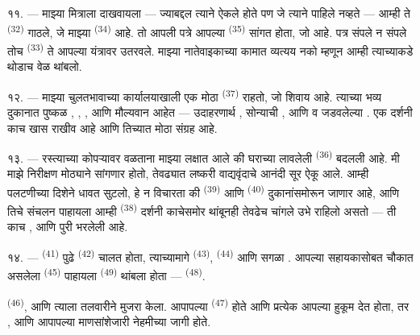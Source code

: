 ११. --- माझ्या मित्राला  दाखवायला — ज्याबद्दल त्याने ऐकले होते पण जे
त्याने पाहिले नव्हते — आम्ही ते  \textsuperscript{(32)} गाठले, जे माझ्या
 \textsuperscript{(34)} आहे. तो आपली पत्रे आपल्या 
\textsuperscript{(35)} सांगत होता, जो  आहे. पत्र संपले न संपले तोच
 \textsuperscript{(33)} ते आपल्या यंत्रावर उतरवले. माझ्या नातेवाइकाच्या
कामात व्यत्यय नको म्हणून आम्ही त्याच्याकडे थोडाच वेळ थांबलो.

१२. --- माझ्या चुलतभावाच्या कार्यालयाखाली एक मोठा 
\textsuperscript{(37)} राहतो, जो शिवाय  आहे. त्याच्या भव्य दुकानात पुष्कळ
, , ,  आणि
मौल्यवान  आहेत — उदाहरणार्थ , सोन्याची ,
 आणि  व  जडवलेल्या . एक
दर्शनी काच खास  राखीव आहे आणि तिच्यात
 मोठा संग्रह आहे.

१३. --- रस्त्याच्या कोपऱ्यावर वळताना माझ्या लक्षात आले की घराच्या  लावलेली
 \textsuperscript{(36)} बदलली आहे. मी माझे निरीक्षण मोठ्याने सांगणार होतो,
तेवढ्यात  लष्करी वाद्यवृंदाचे आनंदी सूर ऐकू आले. आम्ही पलटणीच्या दिशेने धावत
सुटलो, हे न विचारता की   \textsuperscript{(39)} आणि
 \textsuperscript{(40)} दुकानांसमोरून जाणार आहे, आणि तिचे संचलन
पाहायला आम्ही  \textsuperscript{(38)} दर्शनी काचेसमोर थांबूनही तेवढेच
चांगले उभे राहिलो असतो — ती काच ,
 आणि  पुरी भरलेली आहे.

\VUsaut{3.0mm}

१४. ---  \textsuperscript{(41)} पुढे 
\textsuperscript{(42)} चालत होता, त्याच्यामागे  \textsuperscript{(43)},
 \textsuperscript{(44)} आणि सगळा . आपल्या सहायकासोबत चौकात
असलेला  \textsuperscript{(45)}  पाहायला 
\textsuperscript{(49)} थांबला होता —  \textsuperscript{(48)}.

 \textsuperscript{(46)},  आणि  त्याला तलवारीने मुजरा केला.  आपापल्या  \textsuperscript{(47)} होते आणि प्रत्येक  आपल्या  हुकूम देत होता, तर ,  आणि  आपापल्या माणसांशेजारी नेहमीच्या जागी होते.

